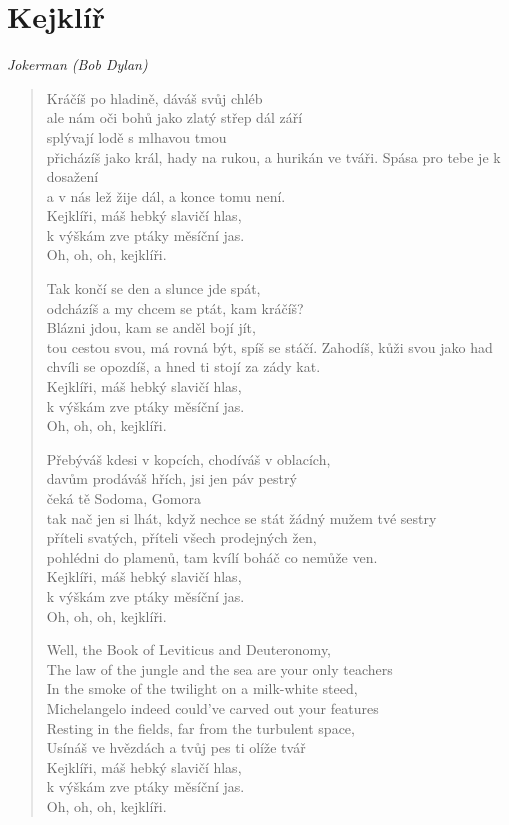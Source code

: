 \section*{Kejklíř}

\textit{Jokerman (Bob Dylan)}

\begin{verse}
Kráčíš po hladině, dáváš svůj chléb\\
ale nám oči bohů jako zlatý střep dál září\\ 
splývají lodě s mlhavou tmou\\
přicházíš jako král, hady na rukou, a hurikán ve tváři. 
Spása pro tebe je k dosažení\\
a v nás lež žije dál, a konce tomu není. \\
Kejklíři, máš hebký slavičí hlas,\\
k výškám zve ptáky měsíční jas. \\
Oh, oh, oh, kejklíři.

Tak končí se den a slunce jde spát, \\
odcházíš a my chcem se ptát, kam kráčíš? \\
Blázni jdou, kam se anděl bojí jít, \\
tou cestou svou, má rovná být, spíš se stáčí.
Zahodíš, kůži svou jako had \\
chvíli se opozdíš, a hned ti stojí za zády kat. \\
Kejklíři, máš hebký slavičí hlas,\\
k výškám zve ptáky měsíční jas. \\
Oh, oh, oh, kejklíři.

Přebýváš kdesi v kopcích, chodíváš v oblacích, \\
davům prodáváš hřích, jsi jen páv pestrý \\
čeká tě Sodoma, Gomora \\
tak nač jen si lhát, když nechce se stát žádný mužem tvé sestry  \\
příteli svatých, příteli všech prodejných žen, \\
pohlédni do plamenů, tam kvílí boháč co nemůže ven. \\
Kejklíři, máš hebký slavičí hlas,\\
k výškám zve ptáky měsíční jas. \\
Oh, oh, oh, kejklíři.

Well, the Book of Leviticus and Deuteronomy, \\
The law of the jungle and the sea are your only teachers \\
In the smoke of the twilight on a milk-white steed, \\
Michelangelo indeed could've carved out your features \\
Resting in the fields, far from the turbulent space, \\
Usínáš ve hvězdách a tvůj pes ti olíže tvář \\
Kejklíři, máš hebký slavičí hlas,\\
k výškám zve ptáky měsíční jas. \\
Oh, oh, oh, kejklíři.


\end{verse}
